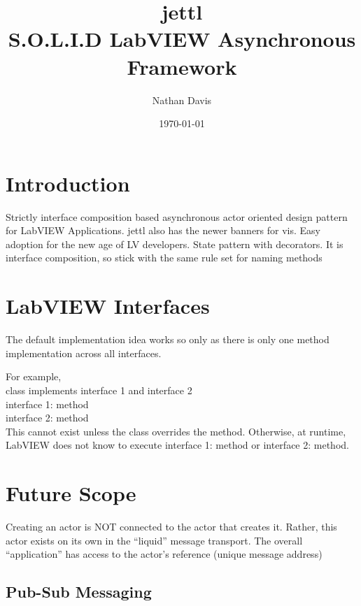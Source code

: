 \documentclass{article}
\title{jettl \\ S.O.L.I.D LabVIEW Asynchronous Framework}
\author{Nathan Davis}
\date{\today}
\begin{document}
\maketitle

\maketitle

\section{Introduction}
\label{sec:introduction}

Strictly interface composition based asynchronous actor oriented design pattern for LabVIEW Applications.
jettl also has the newer banners for vis. Easy adoption for the new age of LV developers.
State pattern with decorators.
It is interface composition, so stick with the same rule set for naming methods

\section{LabVIEW Interfaces}
\label{sec:labview-interfaces}

The default implementation idea works so only as there is only one method implementation across all interfaces.

For example, \\
class implements interface 1 and interface 2 \\
interface 1: method \\
interface 2: method \\
This cannot exist unless the class overrides the method.
Otherwise, at runtime, LabVIEW does not know to execute interface 1: method or interface 2: method.

\section{Future Scope}
\label{sec:future-scope}

Creating an actor is NOT connected to the actor that creates it.
Rather, this actor exists on its own in the “liquid” message transport.
The overall “application” has access to the actor's reference (unique message address)

\subsection{Pub-Sub Messaging}
\label{subsec:pub-sub-messaging}
\end{document}
